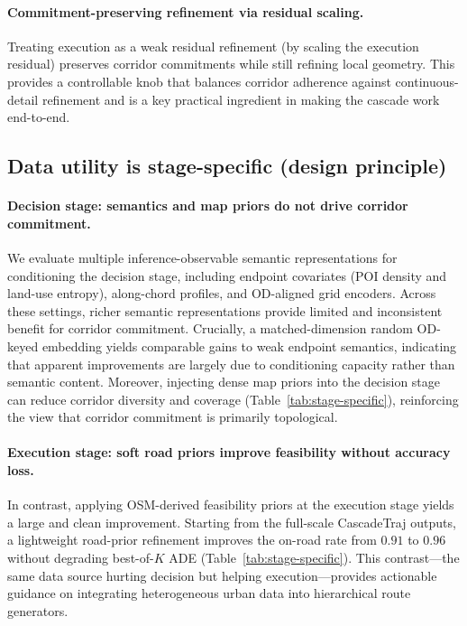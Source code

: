 \paragraph{Commitment-preserving refinement via residual scaling.}
Treating execution as a weak residual refinement (by scaling the execution residual) preserves corridor commitments while still refining local geometry.
This provides a controllable knob that balances corridor adherence against continuous-detail refinement and is a key practical ingredient in making the cascade work end-to-end.

\subsection{Data utility is stage-specific (design principle)}
\paragraph{Decision stage: semantics and map priors do not drive corridor commitment.}
We evaluate multiple inference-observable semantic representations for conditioning the decision stage, including endpoint covariates (POI density and land-use entropy), along-chord profiles, and OD-aligned grid encoders.
Across these settings, richer semantic representations provide limited and inconsistent benefit for corridor commitment.
Crucially, a matched-dimension random OD-keyed embedding yields comparable gains to weak endpoint semantics, indicating that apparent improvements are largely due to conditioning capacity rather than semantic content.
Moreover, injecting dense map priors into the decision stage can reduce corridor diversity and coverage (Table~\ref{tab:stage-specific}), reinforcing the view that corridor commitment is primarily topological.

\paragraph{Execution stage: soft road priors improve feasibility without accuracy loss.}
In contrast, applying OSM-derived feasibility priors at the execution stage yields a large and clean improvement.
Starting from the full-scale CascadeTraj outputs, a lightweight road-prior refinement improves the on-road rate from $0.91$ to $0.96$ without degrading best-of-$K$ ADE (Table~\ref{tab:stage-specific}).
This contrast---the same data source hurting decision but helping execution---provides actionable guidance on integrating heterogeneous urban data into hierarchical route generators.

